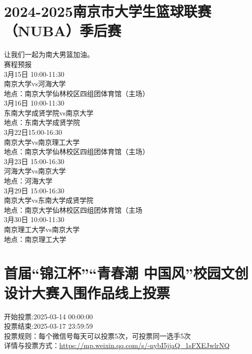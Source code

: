 \documentclass[letterpaper, 12pt]{article}
\begin{document}
\begin{multicols}{2}
\section{2024-2025南京市大学生篮球联赛（NUBA）季后赛}
让我们一起为南大男篮加油。\\
赛程预报\\
3月15日 10:00-11:30\\
南京大学vs河海大学\\
地点：南京大学仙林校区四组团体育馆（主场）\\
3月16日 10:00-11:30\\
东南大学成贤学院vs南京大学\\
地点：东南大学成贤学院\\
3月22日15:00-16:30\\
南京大学vs南京理工大学\\
地点：南京大学仙林校区四组团体育馆（主场）\\
3月23日 15:00-16:30\\
河海大学vs南京大学\\
地点：河海大学\\
3月29日 15:00-16:30\\
南京大学vs东南大学成贤学院\\
地点：南京大学仙林校区四组团体育馆（主场\\
3月30日 10:00-11:30\\
南京理工大学vs南京大学\\
地点：南京理工大学\\

\section{首届“锦江杯”“青春潮 中国风”校园文创设计大赛入围作品线上投票}
开始投票:2025-03-14 00:00:00\\
投票结束:2025-03-17 23:59:59\\
投票规则：每个微信号每天可以投票5次，可投票同一选手5次\\
详情与投票方式：\url{https://mp.weixin.qq.com/s/-nybI5jjaQ_1sFXEJwlrNQ}




\end{multicols}
\end{document}
